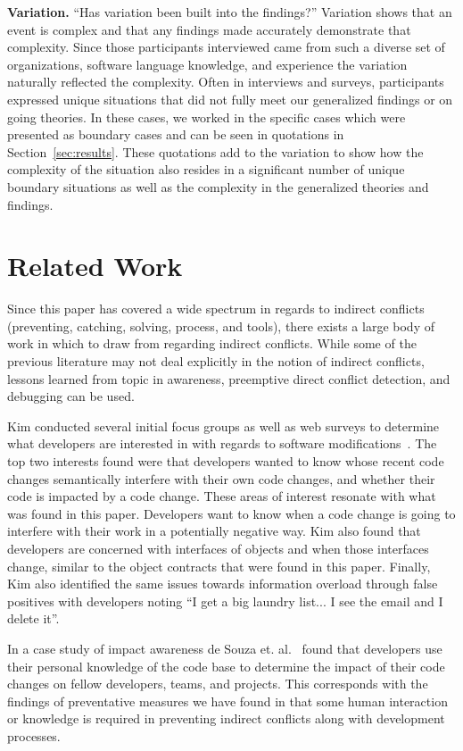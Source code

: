 \documentclass[conference]{IEEEtran}
\begin{document}
{\bfseries Variation.} ``Has variation been built into the findings?'' Variation shows that an event is complex and that any findings
made accurately demonstrate that complexity. Since those participants interviewed came from such a diverse set of organizations, 
software language knowledge, and experience the variation naturally reflected the complexity. Often in interviews and surveys, participants
expressed unique situations that did not fully meet our generalized findings or on going theories. In these cases, we worked in the specific
cases which were presented as boundary cases and can be seen in quotations in Section~\ref{sec:results}. These quotations add to the variation
to show how the complexity of the situation also resides in a significant number of unique boundary situations as well as the complexity
in the generalized theories and findings.

\section{Related Work}
\label{sec:related}

Since this paper has covered a wide spectrum in regards to indirect conflicts (preventing, catching, solving, process, and tools), there
exists a large body of work in which to draw from regarding indirect conflicts. While some of the previous literature may not deal explicitly
in the notion of indirect conflicts, lessons learned from topic in awareness, preemptive direct conflict detection, and debugging can be used.

Kim conducted several initial focus groups as well as web surveys to determine what developers are interested in with regards to software
modifications~\cite{Kim:2011:ESA}. The top two interests found were that developers wanted to know whose recent code changes semantically
interfere with their own code changes, and whether their code is impacted by a code change. These areas of interest resonate with what was
found in this paper. Developers want to know when a code change is going to interfere with their work in a potentially negative way.  Kim
also found that developers are concerned with interfaces of objects and when those interfaces change, similar to the object contracts that
were found in this paper. Finally, Kim also identified the same issues towards information overload through false positives with developers
noting ``I get a big laundry list... I see the email and I delete it''.

In a case study of impact awareness de Souza et. al.~\cite{deSouza:2008:ESS} found that developers use their personal knowledge of the
code base to determine the impact of their code changes on fellow developers, teams, and projects. This corresponds with the findings of
preventative measures we have found in that some human interaction or knowledge is required in preventing indirect conflicts along with
development processes.
\end{document}
